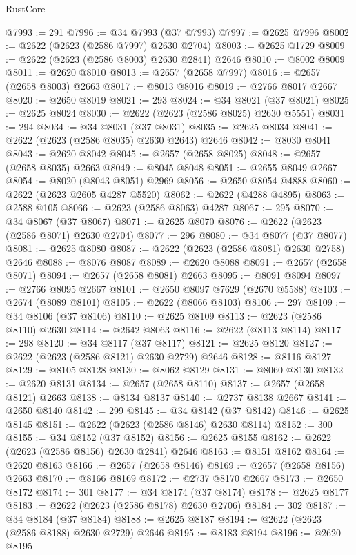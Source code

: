 \begin{lexlean}{RustCore}
\begin{coremodule}
@7993 := 291
@7996 := @34 @7993 (@37 @7993)
@7997 := @2625 @7996
@8002 := @2622 (@2623 (@2586 @7997) @2630 @2704)
@8003 := @2625 @1729
@8009 := @2622 (@2623 (@2586 @8003) @2630 @2841) @2646
@8010 := @8002 @8009
@8011 := @2620 @8010
@8013 := @2657 (@2658 @7997)
@8016 := @2657 (@2658 @8003) @2663
@8017 := @8013 @8016
@8019 := @2766 @8017 @2667
@8020 := @2650 @8019
@8021 := 293
@8024 := @34 @8021 (@37 @8021)
@8025 := @2625 @8024
@8030 := @2622 (@2623 (@2586 @8025) @2630 @5551)
@8031 := 294
@8034 := @34 @8031 (@37 @8031)
@8035 := @2625 @8034
@8041 := @2622 (@2623 (@2586 @8035) @2630 @2643) @2646
@8042 := @8030 @8041
@8043 := @2620 @8042
@8045 := @2657 (@2658 @8025)
@8048 := @2657 (@2658 @8035) @2663
@8049 := @8045 @8048
@8051 := @2655 @8049 @2667
@8054 := @8020 (@8043 @8051) @2969
@8056 := @2650 @8054 @4888
@8060 := @2622 (@2623 @2605 @4287 @5520)
@8062 := @2622 (@4288 @4895)
@8063 := @2588 @105
@8066 := @2623 (@2586 @8063) @4287
@8067 := 295
@8070 := @34 @8067 (@37 @8067)
@8071 := @2625 @8070
@8076 := @2622 (@2623 (@2586 @8071) @2630 @2704)
@8077 := 296
@8080 := @34 @8077 (@37 @8077)
@8081 := @2625 @8080
@8087 := @2622 (@2623 (@2586 @8081) @2630 @2758) @2646
@8088 := @8076 @8087
@8089 := @2620 @8088
@8091 := @2657 (@2658 @8071)
@8094 := @2657 (@2658 @8081) @2663
@8095 := @8091 @8094
@8097 := @2766 @8095 @2667
@8101 := @2650 @8097 @7629 (@2670 @5588)
@8103 := @2674 (@8089 @8101)
@8105 := @2622 (@8066 @8103)
@8106 := 297
@8109 := @34 @8106 (@37 @8106)
@8110 := @2625 @8109
@8113 := @2623 (@2586 @8110) @2630
@8114 := @2642 @8063
@8116 := @2622 (@8113 @8114)
@8117 := 298
@8120 := @34 @8117 (@37 @8117)
@8121 := @2625 @8120
@8127 := @2622 (@2623 (@2586 @8121) @2630 @2729) @2646
@8128 := @8116 @8127
@8129 := @8105 @8128
@8130 := @8062 @8129
@8131 := @8060 @8130
@8132 := @2620 @8131
@8134 := @2657 (@2658 @8110)
@8137 := @2657 (@2658 @8121) @2663
@8138 := @8134 @8137
@8140 := @2737 @8138 @2667
@8141 := @2650 @8140
@8142 := 299
@8145 := @34 @8142 (@37 @8142)
@8146 := @2625 @8145
@8151 := @2622 (@2623 (@2586 @8146) @2630 @8114)
@8152 := 300
@8155 := @34 @8152 (@37 @8152)
@8156 := @2625 @8155
@8162 := @2622 (@2623 (@2586 @8156) @2630 @2841) @2646
@8163 := @8151 @8162
@8164 := @2620 @8163
@8166 := @2657 (@2658 @8146)
@8169 := @2657 (@2658 @8156) @2663
@8170 := @8166 @8169
@8172 := @2737 @8170 @2667
@8173 := @2650 @8172
@8174 := 301
@8177 := @34 @8174 (@37 @8174)
@8178 := @2625 @8177
@8183 := @2622 (@2623 (@2586 @8178) @2630 @2706)
@8184 := 302
@8187 := @34 @8184 (@37 @8184)
@8188 := @2625 @8187
@8194 := @2622 (@2623 (@2586 @8188) @2630 @2729) @2646
@8195 := @8183 @8194
@8196 := @2620 @8195

\end{coremodule}
\end{lexlean}
